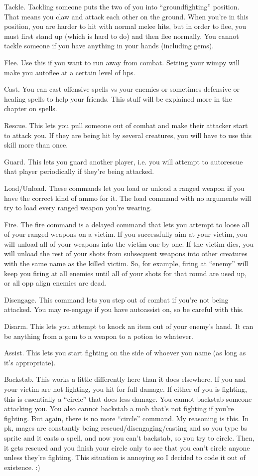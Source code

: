 \bul Tackle. Tackling someone puts the two of you into
``groundfighting'' position. That means you claw and attack each other
on the ground. When you're in this position, you are harder to hit
with normal melee hits, but in order to flee, you must first stand up
(which is hard to do) and then flee normally. You cannot tackle
someone if you have anything in your hands (including gems).

\bul Flee. Use this if you want to run away from combat. Setting your
wimpy will make you autoflee at a certain level of hps.

\bul Cast. You can cast offensive spells vs your enemies or sometimes
defensive or healing spells to help your friends. This stuff will be
explained more in the chapter on spells.

\bul Rescue. This lets you pull someone out of combat and make their
attacker start to attack you. If they are being hit by several
creatures, you will have to use this skill more than once. 

\bul Guard. This lets you guard another player, i.e. you will attempt
to autorescue that player periodically if they're being attacked.

\bul Load/Unload. These commands let you load or unload a ranged
weapon if you have the correct kind of ammo for it. The load command
with no arguments will try to load every ranged weapon you're wearing.

\bul Fire. The fire command is a delayed command that lets you attempt
to loose all of your ranged weapons on a victim. If you successfully
aim at your victim, you will unload all of your weapons into the
victim one by one. If the victim dies, you will unload the rest of
your shots from subsequent weapons into other creatures with the same
name as the killed victim. So, for example, firing at ``enemy'' will
keep you firing at all enemies until all of your shots for that round
are used up, or all opp align enemies are dead.

\bul Disengage. This command lets you step out of combat if you're not
being attacked. You may re-engage if you have autoassist on, so be
careful with this.

\bul Disarm. This lets you attempt to knock an item out of your
enemy's hand. It can be anything from a gem to a weapon to a potion to
whatever.

\bul Assist. This lets you start fighting on the side of whoever you
name (as long as it's appropriate).

\bul Backstab. This works a little differently here than it does
elsewhere. If you and your victim are not fighting, you hit for full
damage. If either of you is fighting, this is essentially a ``circle''
that does less damage. You cannot backstab someone attacking you. You
also cannot backstab a mob that's not fighting if you're fighting. But
again, there is no more ``circle'' command. My reasoning is this. In
pk, mages are constantly being rescued/disengaging/casting and so you
type bs sprite and it casts a spell, and now you can't backstab, so
you try to circle. Then, it gets rescued and you finish your circle
only to see that you can't circle anyone unless they're fighting. This
situation is annoying so I decided to code it out of existence. :)


